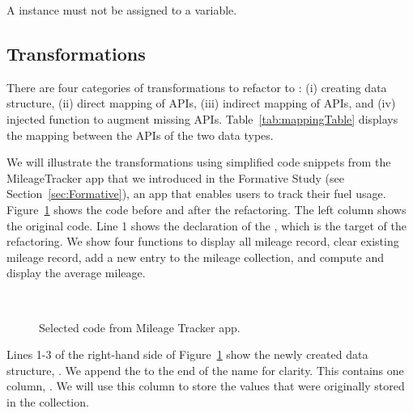 \documentclass[preprint]{sigplanconf}
\begin{document}
\PTwo A \NC{} instance must not be assigned to a variable.

\subsection{Transformations}
\label{sec:transformations}

There are four categories of transformations to refactor \NC{} to : 
(i) creating \CDT{} data structure, (ii) direct mapping of APIs, (iii) indirect mapping of APIs, and (iv) injected function to augment missing APIs. Table~\ref{tab:mappingTable} displays the mapping between the APIs of the two data types.

We will illustrate the transformations using simplified code snippets from the MileageTracker app that we introduced in the Formative Study (see Section~\ref{sec:Formative}), an app that enables users to track their fuel usage. Figure~\ref{fig:codeTransformations} shows the code before and after the refactoring. The left column shows the original code. 
Line 1 shows the declaration of the  \NC{}, which is the target of the refactoring. We show four functions to display all mileage record, clear existing mileage record, add a new entry to the mileage collection, and compute and display the average mileage. \\

\begin{figure}
   \centering
    \mbox{
      \subfigure[before]{
      
      \label{fig:aicOverload}
      }
      \hspace{0.2in}
      \subfigure[after]{
      
      \label{fig:lambdaOverload}
      }
    }
    \caption{Selected code from Mileage Tracker app.}
    \label{fig:codeTransformations}
\end{figure}

Lines 1-3 of the right-hand side of Figure~\ref{fig:codeTransformations} show the newly created data structure, . We append the  to the end of the name for clarity. This  contains one column, . We will use this column to store the values that were originally stored in the  collection.
\\
\end{document}
